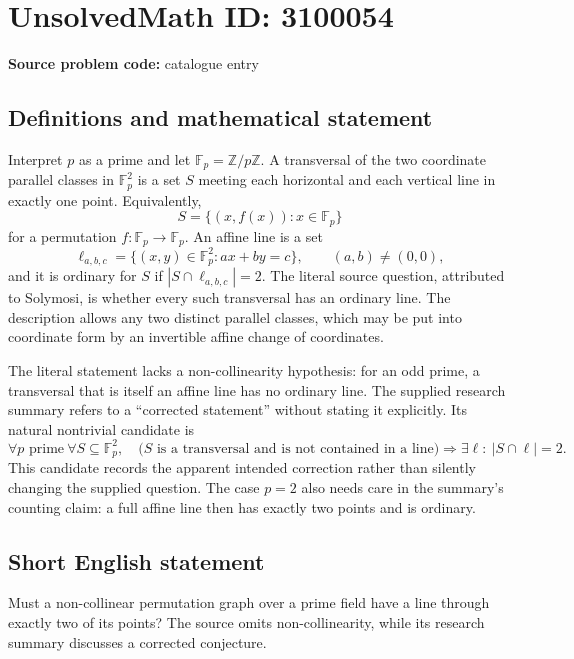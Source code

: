 \documentclass[11pt]{article}
\newcommand{\Z}{\mathbb{Z}}
\newcommand{\F}{\mathbb{F}}
\begin{document}
\section*{UnsolvedMath ID: 3100054}
\textbf{Source problem code:} catalogue entry
\subsection{Definitions and mathematical statement}
Interpret $p$ as a prime and let $\F_p=\Z/p\Z$. A transversal of the two coordinate parallel classes in $\F_p^2$ is a set $S$ meeting each horizontal and each vertical line in exactly one point. Equivalently,
\[
S=\{(x,f(x)):x\in\F_p\}
\]
for a permutation $f:\F_p\to\F_p$. An affine line is a set
\[
\ell_{a,b,c}=\{(x,y)\in\F_p^2:ax+by=c\},\qquad (a,b)\ne(0,0),
\]
and it is ordinary for $S$ if $|S\cap\ell_{a,b,c}|=2$. The literal source question, attributed to Solymosi, is whether every such transversal has an ordinary line. The description allows any two distinct parallel classes, which may be put into coordinate form by an invertible affine change of coordinates.

The literal statement lacks a non-collinearity hypothesis: for an odd prime, a transversal that is itself an affine line has no ordinary line. The supplied research summary refers to a ``corrected statement'' without stating it explicitly. Its natural nontrivial candidate is
\[
\forall p\text{ prime}\ \forall S\subseteq\F_p^2,\quad
\bigl(S\text{ is a transversal and is not contained in a line}\bigr)
\Longrightarrow\exists\ell:\ |S\cap\ell|=2.
\]
This candidate records the apparent intended correction rather than silently changing the supplied question. The case $p=2$ also needs care in the summary's counting claim: a full affine line then has exactly two points and is ordinary.
\subsection{Short English statement}
Must a non-collinear permutation graph over a prime field have a line through exactly two of its points? The source omits non-collinearity, while its research summary discusses a corrected conjecture.
\end{document}
